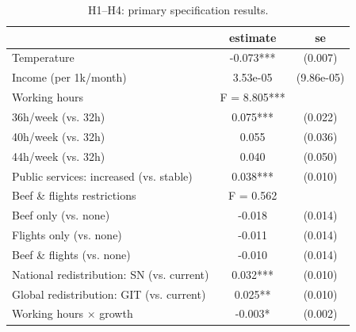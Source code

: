 \begin{table}[H]
    \centering
    \caption{H1--H4: primary specification results.}
    \begin{tabular}{ l c c }
\hline \hline
 & estimate & se \\
\hline
\hspace{0.05cm} Temperature & -0.073*** & (0.007) \\
\hspace{0.05cm} Income (per 1k/month) & 3.53e-05 & (9.86e-05) \\
\hspace{0.05cm} Working hours & F = 8.805*** &  \\
\hspace{0.05cm} \hspace{1em} 36h/week (vs. 32h) & 0.075*** & (0.022) \\
\hspace{0.05cm} \hspace{1em} 40h/week (vs. 32h) & 0.055 & (0.036) \\
\hspace{0.05cm} \hspace{1em} 44h/week (vs. 32h) & 0.040 & (0.050) \\
\hspace{0.05cm} Public services: increased (vs. stable) & 0.038*** & (0.010) \\
\hspace{0.05cm} Beef \& flights restrictions & F = 0.562 &  \\
\hspace{0.05cm} \hspace{1em} Beef only (vs. none) & -0.018 & (0.014) \\
\hspace{0.05cm} \hspace{1em} Flights only (vs. none) & -0.011 & (0.014) \\
\hspace{0.05cm} \hspace{1em} Beef \& flights (vs. none) & -0.010 & (0.014) \\
\hspace{0.05cm} National redistribution: SN (vs. current) & 0.032*** & (0.010) \\
\hspace{0.05cm} Global redistribution: GIT (vs. current) & 0.025** & (0.010) \\
\hspace{0.05cm} Working hours $\times$ growth & -0.003* & (0.002) \\

\end{tabular}
\end{table}
